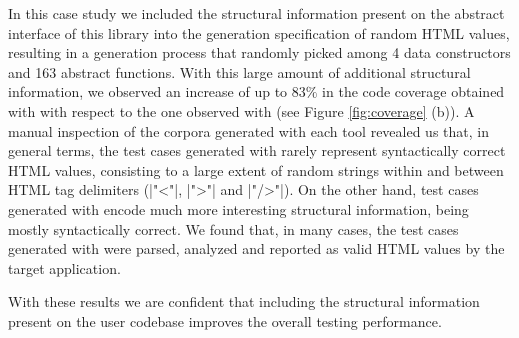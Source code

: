 In this case study we included the structural information present on the abstract
interface of this library into the generation specification of random HTML
values, resulting in a generation process that randomly picked among 4 data
constructors and 163 abstract functions.
%
With this large amount of additional structural information, we observed an
increase of up to $83\%$ in the code coverage obtained with \dragenp with
respect to the one observed with \dragen (see Figure \ref{fig:coverage} (b)).
%
A manual inspection of the corpora generated with each tool revealed us that, in
general terms, the test cases generated with \dragen rarely represent
syntactically correct HTML values, consisting to a large extent of random
strings within and between HTML tag delimiters (|"<"|, |">"| and |"/>"|).
%
On the other hand, test cases generated with \dragenp encode much more
interesting structural information, being mostly syntactically correct.
%
We found that, in many cases, the test cases generated with \dragenp were
parsed, analyzed and reported as valid HTML values by the target application.


With these results we are confident that including the structural information
present on the user codebase improves the overall testing performance.
%
